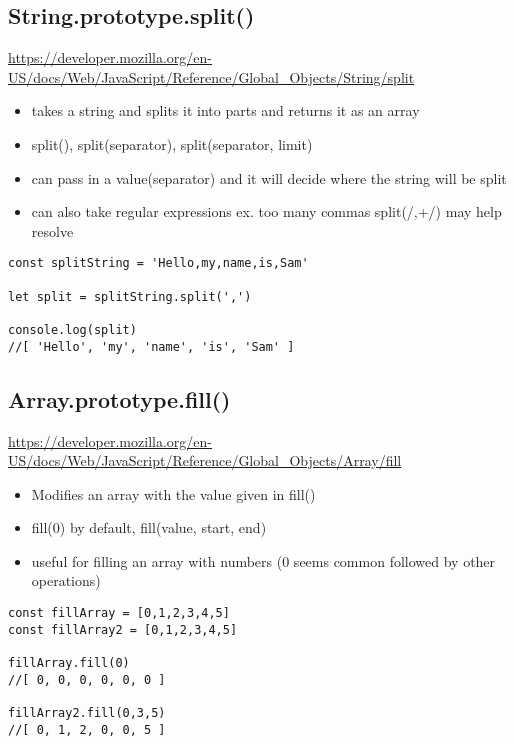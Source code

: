 \documentclass[10pt]{article}
\begin{document}
\subsection{String.prototype.split()}

\url{https://developer.mozilla.org/en-US/docs/Web/JavaScript/Reference/Global_Objects/String/split}

\begin{itemize}
	\item takes a string and splits it into parts and returns it as an array
	\item split(), split(separator), split(separator, limit) 
	\item can pass in a value(separator) and it will decide where the string will be split
	\item can also take regular expressions ex. too many commas split(/,+/) may help resolve
\end{itemize}

	
\begin{lstlisting}[title=Example split(), captionpos=t]
const splitString = 'Hello,my,name,is,Sam'

let split = splitString.split(',')

console.log(split) 
//[ 'Hello', 'my', 'name', 'is', 'Sam' ]
\end{lstlisting}
\medskip %


\medskip %
\pagebreak
\subsection{Array.prototype.fill()}

\url{https://developer.mozilla.org/en-US/docs/Web/JavaScript/Reference/Global_Objects/Array/fill}

\begin{itemize}
	\item Modifies an array with the value given in fill() 
	\item fill(0) by default, fill(value, start, end)
	\item useful for filling an array with numbers (0 seems common followed by other operations)
\end{itemize}

	
\begin{lstlisting}[title=Example fill(), captionpos=t]
const fillArray = [0,1,2,3,4,5]
const fillArray2 = [0,1,2,3,4,5]

fillArray.fill(0)
//[ 0, 0, 0, 0, 0, 0 ]

fillArray2.fill(0,3,5)
//[ 0, 1, 2, 0, 0, 5 ]
\end{lstlisting}
\medskip %
\end{document}
